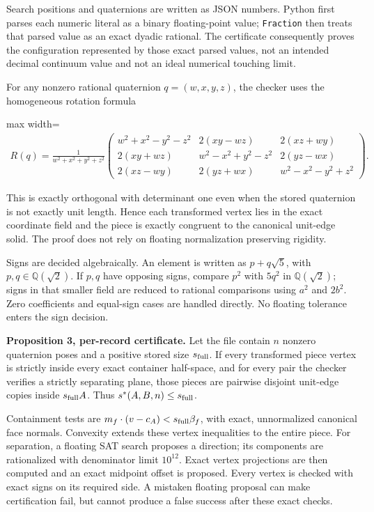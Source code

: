\documentclass[11pt,a4paper]{article}
\begin{document}
Search positions and quaternions are written as JSON numbers. Python first parses each numeric literal as a binary floating-point value; \nolinkurl{Fraction} then treats that parsed value as an exact dyadic rational. The certificate consequently proves the configuration represented by those exact parsed values, not an intended decimal continuum value and not an ideal numerical touching limit.

For any nonzero rational quaternion \(q=(w,x,y,z)\), the checker uses the homogeneous rotation formula

\begin{center}\begin{adjustbox}{max width=\linewidth}$\displaystyle\begin{aligned}
R(q)=\frac1{w^2+x^2+y^2+z^2}
\begin{pmatrix}
w^2+x^2-y^2-z^2&2(xy-wz)&2(xz+wy)\\
2(xy+wz)&w^2-x^2+y^2-z^2&2(yz-wx)\\
2(xz-wy)&2(yz+wx)&w^2-x^2-y^2+z^2
\end{pmatrix}.
\end{aligned}$\end{adjustbox}\end{center}

This is exactly orthogonal with determinant one even when the stored quaternion is not exactly unit length. Hence each transformed vertex lies in the exact coordinate field and the piece is exactly congruent to the canonical unit-edge solid. The proof does not rely on floating normalization preserving rigidity.

Signs are decided algebraically. An element is written as \(p+q\sqrt5\), with \(p,q\in\mathbb Q(\sqrt2)\). If \(p,q\) have opposing signs, compare \(p^2\) with \(5q^2\) in \(\mathbb Q(\sqrt2)\); signs in that smaller field are reduced to rational comparisons using \(a^2\) and \(2b^2\). Zero coefficients and equal-sign cases are handled directly. No floating tolerance enters the sign decision.

\textbf{Proposition 3, per-record certificate.} Let the file contain \(n\) nonzero quaternion poses and a positive stored size \(s_{\rm full}\). If every transformed piece vertex is strictly inside every exact container half-space, and for every pair the checker verifies a strictly separating plane, those pieces are pairwise disjoint unit-edge copies inside \(s_{\rm full}A\). Thus \(s^*(A,B,n)\le s_{\rm full}\).

Containment tests are \(m_f\cdot(v-c_A)<s_{\rm full}\beta_f\), with exact, unnormalized canonical face normals. Convexity extends these vertex inequalities to the entire piece. For separation, a floating SAT search proposes a direction; its components are rationalized with denominator limit \(10^{12}\). Exact vertex projections are then computed and an exact midpoint offset is proposed. Every vertex is checked with exact signs on its required side. A mistaken floating proposal can make certification fail, but cannot produce a false success after these exact checks.
\end{document}

